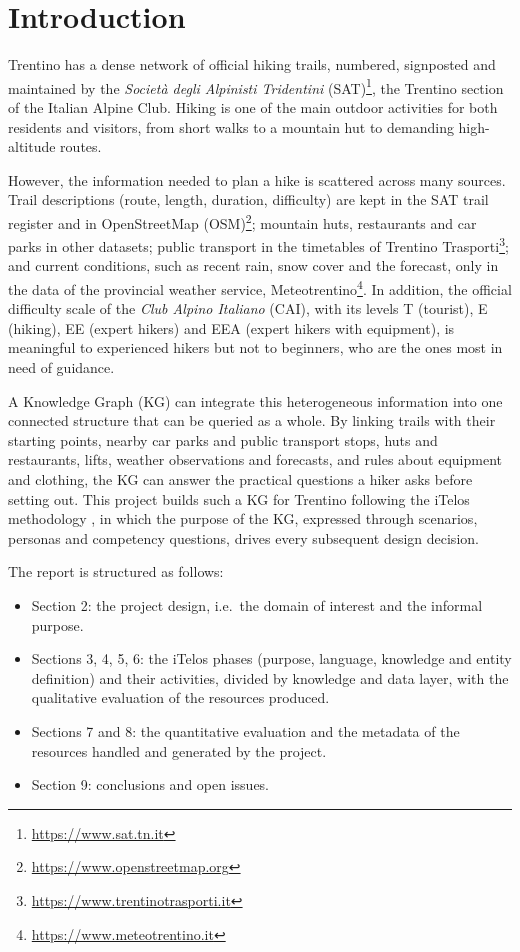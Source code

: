 \section{Introduction}
Trentino has a dense network of official hiking trails, numbered, signposted and maintained by the \emph{Società degli Alpinisti Tridentini} (SAT)\footnote{\url{https://www.sat.tn.it}}, the Trentino section of the Italian Alpine Club. Hiking is one of the main outdoor activities for both residents and visitors, from short walks to a mountain hut to demanding high-altitude routes.

\noindent However, the information needed to plan a hike is scattered across many sources. Trail descriptions (route, length, duration, difficulty) are kept in the SAT trail register and in OpenStreetMap (OSM)\footnote{\url{https://www.openstreetmap.org}}; mountain huts, restaurants and car parks in other datasets; public transport in the timetables of Trentino Trasporti\footnote{\url{https://www.trentinotrasporti.it}}; and current conditions, such as recent rain, snow cover and the forecast, only in the data of the provincial weather service, Meteotrentino\footnote{\url{https://www.meteotrentino.it}}. In addition, the official difficulty scale of the \emph{Club Alpino Italiano} (CAI), with its levels T (tourist), E (hiking), EE (expert hikers) and EEA (expert hikers with equipment), is meaningful to experienced hikers but not to beginners, who are the ones most in need of guidance.

\noindent A Knowledge Graph (KG) \cite{p4,p6} can integrate this heterogeneous information into one connected structure that can be queried as a whole. By linking trails with their starting points, nearby car parks and public transport stops, huts and restaurants, lifts, weather observations and forecasts, and rules about equipment and clothing, the KG can answer the practical questions a hiker asks before setting out. This project builds such a KG for Trentino following the iTelos methodology \cite{p1,p2,p3,p5}, in which the purpose of the KG, expressed through scenarios, personas and competency questions, drives every subsequent design decision.

\noindent The report is structured as follows:
\begin{itemize}
    \item Section 2: the project design, i.e.\ the domain of interest and the informal purpose.
    \item Sections 3, 4, 5, 6: the iTelos phases (purpose, language, knowledge and entity definition) and their activities, divided by knowledge and data layer, with the qualitative evaluation of the resources produced.
    \item Sections 7 and 8: the quantitative evaluation and the metadata of the resources handled and generated by the project.
    \item Section 9: conclusions and open issues.
\end{itemize}
